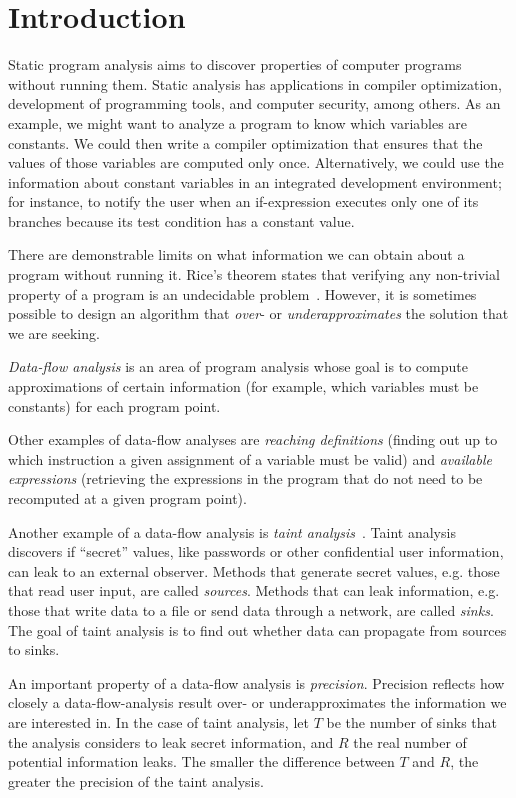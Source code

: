 \section{Introduction}
\begin{odelete}
Static program analysis aims to discover properties of computer programs without running them.
Static analysis has applications in compiler optimization, development of programming tools, and computer security, among others.
As an example, we might want to analyze a program to know which variables are constants. 
We could then write a compiler optimization that ensures that the values of those variables are computed only once.
Alternatively, we could use the information about constant variables in an integrated development environment; for instance, to notify the user when an if-expression executes only one of its branches because its test condition has a constant value.

There are demonstrable limits on what information we can obtain about a program without running it.
Rice's theorem states that verifying any non-trivial property of a program is an undecidable problem~\cite{rice1953classes}. However, it is sometimes possible to design an algorithm that \textit{over}- or \textit{underapproximates} the solution that we are seeking.

\textit{Data-flow analysis} is an area of program analysis whose goal is to compute approximations of certain information (for example, which variables must be constants) for each program point. 

Other examples of data-flow analyses are \textit{reaching definitions} (finding out up to which instruction a given assignment of a variable must be valid) and \textit{available expressions} (retrieving the expressions in the program that do not need to be recomputed at a given program point).

Another example of a data-flow analysis is \textit{taint analysis}~\cite{tripp2009taj}. Taint analysis discovers if ``secret'' values, like passwords or other confidential user information, can leak to an external observer. Methods that generate secret values, e.g. those that read user input, are called \textit{sources}. Methods that can leak information, e.g. those that write data to a file or send data through a network, are called \textit{sinks}. The goal of taint analysis is to find out whether data can propagate from sources to sinks.

An important property of a data-flow analysis is \textit{precision}.
Precision reflects how closely a data-flow-analysis result over- or underapproximates the information we are interested in. In the case of taint analysis, let $T$ be the number of sinks that the analysis considers to leak secret information, and $R$ the real number of potential information leaks. The smaller the difference between $T$ and $R$, the greater the precision of the taint analysis.


\end{odelete}
